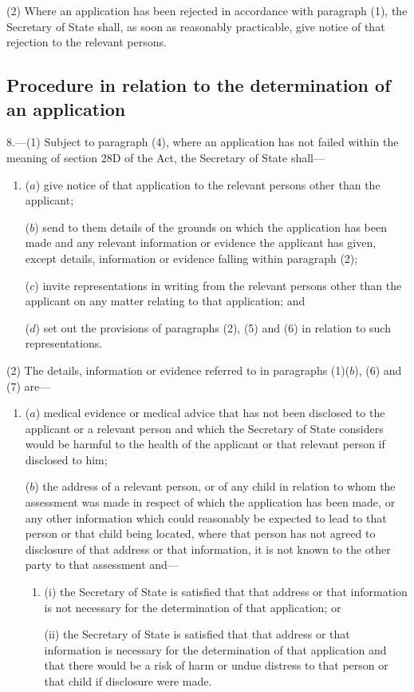 \documentclass[a4paper]{article}
\begin{document}
(2) Where an application has been rejected in accordance with paragraph (1), the
Secretary of State shall, as soon as reasonably practicable, give notice of that
rejection to the relevant persons.

\subsection[8. Procedure in relation to the determination of an application]{Procedure in relation to the determination of an application}

8.—(1) Subject to
paragraph (4), where an application has not failed within the meaning of section
28D of the Act, the Secretary of State shall—
\begin{enumerate}\item[]
($a$) give notice of that application to the relevant persons other than the
applicant;

($b$) send to them details of the grounds on which the application has been made
and any relevant information or evidence the applicant has given, except
details, information or evidence falling within paragraph (2);

($c$) invite representations in writing from the relevant persons other than the
applicant on any matter relating to that application; and

($d$) set out the provisions of paragraphs (2), (5) and (6) in relation to such
representations.
\end{enumerate}

(2) The details, information or evidence referred to in paragraphs (1)($b$), (6)
and (7) are—
\begin{enumerate}\item[]
($a$) medical evidence or medical advice that has not been disclosed to the
applicant or a relevant person and which the Secretary of State considers would
be harmful to the health of the applicant or that relevant person if disclosed
to him;

($b$) the address of a relevant person, or of any child in relation to whom the
assessment was made in respect of which the application has been made, or any
other information which could reasonably be expected to lead to that person or
that child being located, where that person has not agreed to disclosure of that
address or that information, it is not known to the other party to that
assessment and—
\begin{enumerate}\item[]
(i) the Secretary of State is satisfied that that address or that information is
not necessary for the determination of that application; or

(ii) the Secretary of State is satisfied that that address or that information is
necessary for the determination of that application and that there would be a
risk of harm or undue distress to that person or that child if disclosure were
made.
\end{enumerate}
\end{enumerate}
\end{document}
